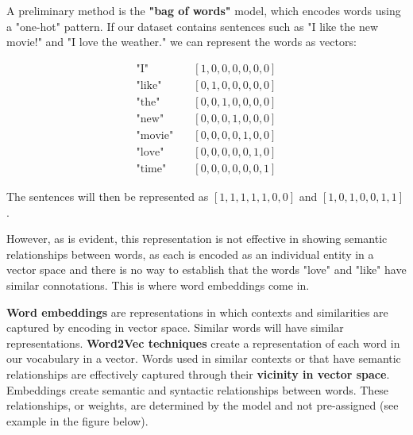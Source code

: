 A preliminary method is the \textbf{"bag of words"} model, which encodes words using a "one-hot" pattern. If our dataset contains sentences such as "I like the new movie!" and "I love the weather." we can represent the words as vectors:

\vspace{-1cm}
\begin{minipage}[t]{0.45\textwidth}
\begin{align*}
\text{"I"} \quad &[1,0,0,0,0,0,0] \\
\text{"like"} \quad &[0,1,0,0,0,0,0] \\
\text{"the"} \quad &[0,0,1,0,0,0,0] \\
\text{"new"} \quad &[0,0,0,1,0,0,0] \\
\text{"movie"}\quad  &[0,0,0,0,1,0,0] \\
\text{"love"} \quad &[0,0,0,0,0,1,0] \\
\text{"time"} \quad &[0,0,0,0,0,0,1]
\end{align*}
\end{minipage}
\begin{minipage}[t]{0.45\textwidth}
\vspace{2cm}
\begin{center}
The sentences will then be represented as $[1,1,1,1,1,0,0]$ and $[1,0,1,0,0,1,1]$.
\end{center}
\end{minipage}
\begin{minipage}[t]{0.1\textwidth}
\end{minipage}

However, as is evident, this representation is not effective in showing semantic relationships between words, as each is encoded as an individual entity in a vector space and there is no way to establish that the words "love" and "like" have similar connotations. This is where word embeddings come in.

\textbf{Word embeddings} are representations in which contexts and similarities are captured by encoding in vector space. Similar words will have similar representations. \textbf{Word2Vec techniques} create a representation of each word in our vocabulary in a vector. Words used in similar contexts or that have semantic relationships are effectively captured through their \textbf{vicinity in vector space}. Embeddings create semantic and syntactic relationships between words. These relationships, or weights, are determined by the model and not pre-assigned (see example in the figure below).

